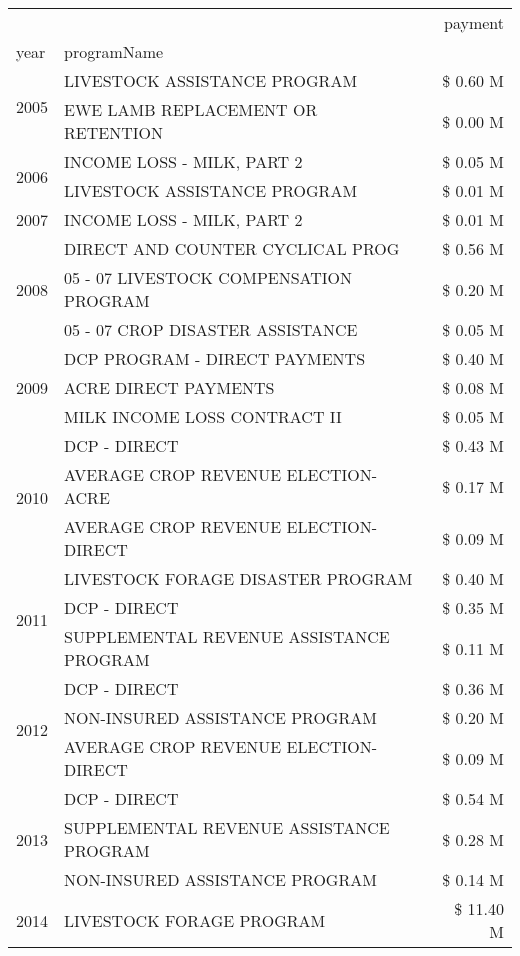 \begin{tabular}{llr}
\toprule
 &  & payment \\
year & programName &  \\
\midrule
\multirow[t]{2}{*}{2005} & LIVESTOCK ASSISTANCE PROGRAM & \$ 0.60 M \\
 & EWE LAMB REPLACEMENT OR RETENTION & \$ 0.00 M \\
\cline{1-3}
\multirow[t]{2}{*}{2006} & INCOME LOSS - MILK, PART 2 & \$ 0.05 M \\
 & LIVESTOCK ASSISTANCE PROGRAM & \$ 0.01 M \\
\cline{1-3}
2007 & INCOME LOSS - MILK, PART 2 & \$ 0.01 M \\
\cline{1-3}
\multirow[t]{3}{*}{2008} & DIRECT AND COUNTER CYCLICAL PROG & \$ 0.56 M \\
 & 05 - 07 LIVESTOCK COMPENSATION PROGRAM & \$ 0.20 M \\
 & 05 - 07 CROP DISASTER ASSISTANCE & \$ 0.05 M \\
\cline{1-3}
\multirow[t]{3}{*}{2009} & DCP PROGRAM - DIRECT PAYMENTS & \$ 0.40 M \\
 & ACRE DIRECT PAYMENTS & \$ 0.08 M \\
 & MILK INCOME LOSS CONTRACT II & \$ 0.05 M \\
\cline{1-3}
\multirow[t]{3}{*}{2010} & DCP - DIRECT & \$ 0.43 M \\
 & AVERAGE CROP REVENUE ELECTION-ACRE & \$ 0.17 M \\
 & AVERAGE CROP REVENUE ELECTION-DIRECT & \$ 0.09 M \\
\cline{1-3}
\multirow[t]{3}{*}{2011} & LIVESTOCK FORAGE DISASTER PROGRAM & \$ 0.40 M \\
 & DCP - DIRECT & \$ 0.35 M \\
 & SUPPLEMENTAL REVENUE ASSISTANCE PROGRAM & \$ 0.11 M \\
\cline{1-3}
\multirow[t]{3}{*}{2012} & DCP - DIRECT & \$ 0.36 M \\
 & NON-INSURED ASSISTANCE PROGRAM & \$ 0.20 M \\
 & AVERAGE CROP REVENUE ELECTION-DIRECT & \$ 0.09 M \\
\cline{1-3}
\multirow[t]{3}{*}{2013} & DCP - DIRECT & \$ 0.54 M \\
 & SUPPLEMENTAL REVENUE ASSISTANCE PROGRAM & \$ 0.28 M \\
 & NON-INSURED ASSISTANCE PROGRAM & \$ 0.14 M \\
\cline{1-3}
\multirow[t]{3}{*}{2014} & LIVESTOCK FORAGE PROGRAM & \$ 11.40 M \\

\end{tabular}
